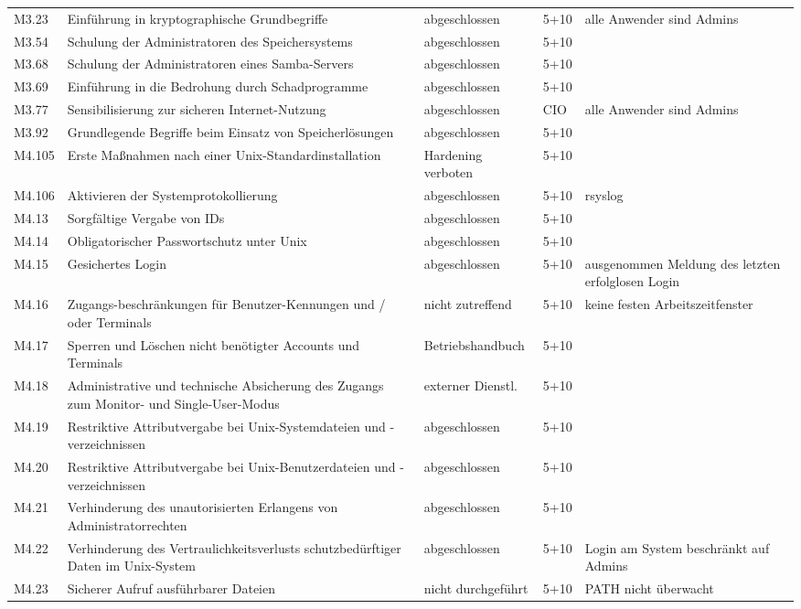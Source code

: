 \begin{longtable}{lp{3.7cm}p{3cm}lp{3.8cm}}
M3.23 & Einführung in kryptographische Grundbegriffe & abgeschlossen & 5+10 & alle Anwender sind Admins \\
M3.54 & Schulung der Administratoren des Speichersystems & abgeschlossen & 5+10 &  \\
M3.68 & Schulung der Administratoren eines Samba-Servers & abgeschlossen & 5+10 &  \\
M3.69 & Einführung in die Bedrohung durch Schadprogramme & abgeschlossen & 5+10 &  \\
M3.77 & Sensibilisierung zur sicheren Internet-Nutzung & abgeschlossen & CIO & alle Anwender sind Admins \\
M3.92 & Grundlegende Begriffe beim Einsatz von Speicherlösungen & abgeschlossen & 5+10 &  \\
M4.105 & Erste Maßnahmen nach einer Unix-Standardinstallation & Hardening verboten & 5+10 &  \\
M4.106 & Aktivieren der Systemprotokollierung & abgeschlossen & 5+10 & rsyslog \\
M4.13 & Sorgfältige Vergabe von IDs & abgeschlossen & 5+10 &  \\
M4.14 & Obligatorischer Passwortschutz unter Unix & abgeschlossen & 5+10 &  \\
M4.15 & Gesichertes Login & abgeschlossen & 5+10 & ausgenommen Meldung des letzten erfolglosen Login \\
M4.16 & Zugangs-beschränkungen für Benutzer-Kennungen und / oder Terminals & nicht zutreffend & 5+10 & keine festen Arbeitszeitfenster \\
M4.17 & Sperren und Löschen nicht benötigter Accounts und Terminals & Betriebshandbuch & 5+10 &  \\
M4.18 & Administrative und technische Absicherung des Zugangs zum Monitor- und Single-User-Modus & externer Dienstl. & 5+10 &  \\
M4.19 & Restriktive Attributvergabe bei Unix-Systemdateien und -verzeichnissen & abgeschlossen & 5+10 &  \\
M4.20 & Restriktive Attributvergabe bei Unix-Benutzerdateien und -verzeichnissen & abgeschlossen & 5+10 &  \\
M4.21 & Verhinderung des unautorisierten Erlangens von Administratorrechten & abgeschlossen & 5+10 &  \\
M4.22 & Verhinderung des Vertraulichkeitsverlusts schutzbedürftiger Daten im Unix-System & abgeschlossen & 5+10 & Login am System beschränkt auf Admins \\
M4.23 & Sicherer Aufruf ausführbarer Dateien & nicht durchgeführt & 5+10 & PATH nicht überwacht \\

\end{longtable}
